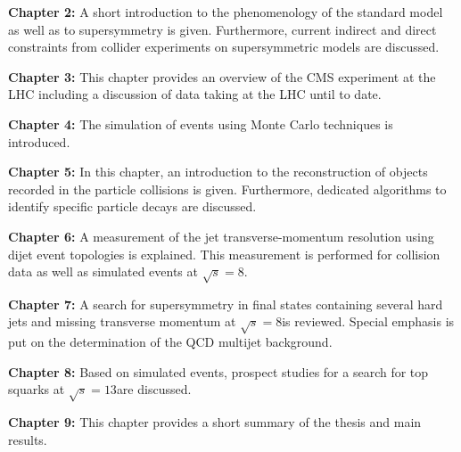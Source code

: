 \begin{description}
 \item \textbf{Chapter 2:} A short introduction to the phenomenology of the standard model as well as to supersymmetry is given. Furthermore, current indirect and direct constraints from collider experiments on supersymmetric models are discussed.
 \item \textbf{Chapter 3:} This chapter provides an overview of the CMS experiment at the LHC including a discussion of data taking at the LHC until to date.
 \item \textbf{Chapter 4:} The simulation of events using Monte Carlo techniques is introduced.
 \item \textbf{Chapter 5:} In this chapter, an introduction to the reconstruction of objects recorded in the particle collisions is given. Furthermore, dedicated algorithms to identify specific particle decays are discussed.
 \item \textbf{Chapter 6:} A measurement of the jet transverse-momentum resolution using dijet event topologies is explained. This measurement is performed for \pp collision data as well as simulated events at $\sqrt{s} = 8$\tev.
 \item \textbf{Chapter 7:} A search for supersymmetry in final states containing several hard jets and missing transverse momentum at $\sqrt{s} = 8$\tev is reviewed. Special emphasis is put on the determination of the QCD multijet background.
 \item \textbf{Chapter 8:} Based on simulated events, prospect studies for a search for top squarks at $\sqrt{s} = 13$\tev are discussed.
 \item \textbf{Chapter 9:} This chapter provides a short summary of the thesis and main results.
\end{description}
